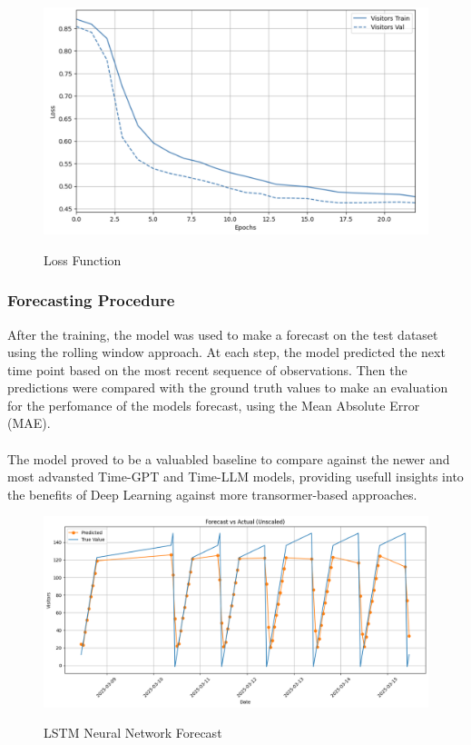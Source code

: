 \documentclass{article}
\begin{document}
\begin{figure}[h]
\includegraphics[width=1\linewidth]{images/loss_function.png}
    \label{fig:mesh1}
    \caption{Loss Function}
\end{figure}

\subsubsection{Forecasting Procedure}
After the training, the model was used to make a forecast on the test dataset using the rolling window approach. At each step, the model predicted the next time point based  on the most recent sequence of observations. Then the predictions were compared with the ground truth values to make an evaluation for the perfomance of the models forecast, using the Mean Absolute Error (MAE). \\
\\
The model proved to be a valuabled baseline to compare against the newer and most advansted Time-GPT and Time-LLM models, providing usefull insights into the benefits of Deep Learning against more transormer-based approaches.

\begin{figure}[h]
\includegraphics[width=1\linewidth]{images/neural_forecast.png}
    \label{fig:mesh1}
    \caption{LSTM Neural Network Forecast}
\end{figure}
\end{document}
